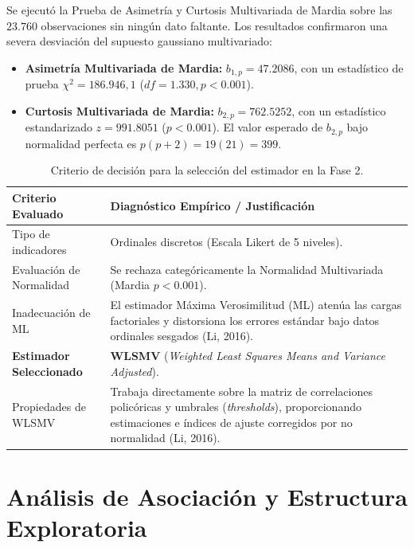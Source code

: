 \documentclass[11pt, a4paper]{article} %
\begin{document}
Se ejecutó la Prueba de Asimetría y Curtosis Multivariada de Mardia sobre las $23.760$ observaciones sin ningún dato faltante. Los resultados confirmaron una severa desviación del supuesto gaussiano multivariado:

\begin{itemize}[itemsep=2pt]
    \item \textbf{Asimetría Multivariada de Mardia:} $b_{1,p} = 47.2086$, con un estadístico de prueba $\chi^2 = 186.946,1$ ($df = 1.330, p < 0.001$).
    \item \textbf{Curtosis Multivariada de Mardia:} $b_{2,p} = 762.5252$, con un estadístico estandarizado $z = 991.8051$ ($p < 0.001$). El valor esperado de $b_{2,p}$ bajo normalidad perfecta es $p(p+2) = 19(21) = 399$.
\end{itemize}

\begin{table}[H]
\centering
\caption{Criterio de decisión para la selección del estimador en la Fase 2.}
\label{tab:decision_estimador}
\footnotesize
\begin{tabularx}{\textwidth}{l X}
\toprule
\textbf{Criterio Evaluado} & \textbf{Diagnóstico Empírico / Justificación} \\
\midrule
Tipo de indicadores & Ordinales discretos (Escala Likert de 5 niveles). \\
Evaluación de Normalidad & Se rechaza categóricamente la Normalidad Multivariada (Mardia $p < 0.001$). \\
Inadecuación de ML & El estimador Máxima Verosimilitud (ML) atenúa las cargas factoriales y distorsiona los errores estándar bajo datos ordinales sesgados (Li, 2016). \\
\textbf{Estimador Seleccionado} & \textbf{WLSMV} (\textit{Weighted Least Squares Means and Variance Adjusted}). \\
Propiedades de WLSMV & Trabaja directamente sobre la matriz de correlaciones policóricas y umbrales (\textit{thresholds}), proporcionando estimaciones e índices de ajuste corregidos por no normalidad (Li, 2016). \\
\bottomrule
\end{tabularx}
\end{table}

\section{Análisis de Asociación y Estructura Exploratoria}
\end{document}
